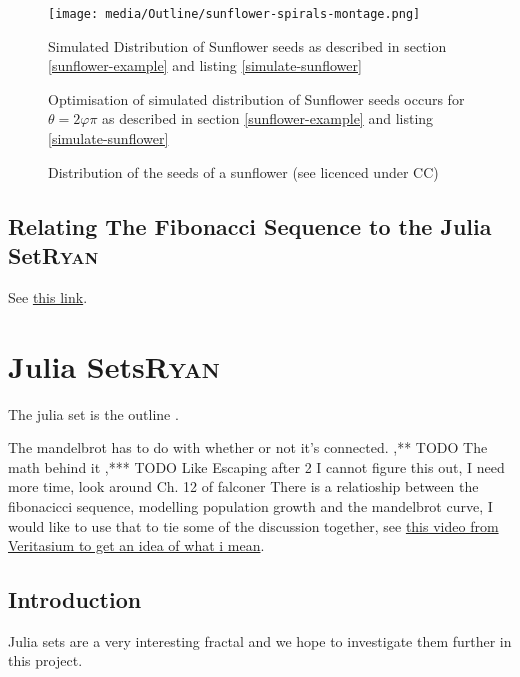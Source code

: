 \documentclass[a4paper,11pt,twoside]{article}
\begin{document}
\begin{figure}[htbp]
\centering
\texttt{[image: media/Outline/sunflower-spirals-montage.png]}
\caption{\label{simulate-sunflower-image}Simulated Distribution of Sunflower seeds as described in section \ref{sunflower-example} and listing \ref{simulate-sunflower}}
\end{figure}

\begin{figure}[htbp]
\centering

\caption{\label{simulate-sunflower-phi}Optimisation of simulated distribution of Sunflower seeds occurs for \(\theta =2 \varphi  \pi\) as described in section \ref{sunflower-example} and listing \ref{simulate-sunflower}}
\end{figure}


\begin{figure}[htbp]
\centering

\caption{\label{sunflower}Distribution of the seeds of a sunflower (see \cite{simonbrassCCSearch2006} licenced under CC)}
\end{figure}

\subsection{Relating The Fibonacci Sequence to the Julia Set\hfill{}\textsc{Ryan}}
\label{sec:org1086a83}
See \href{https://youtu.be/ovJcsL7vyrk}{this link}.
\section{Julia Sets\hfill{}\textsc{Ryan}}
\label{sec:org7b32ed6}

The julia set is the outline \cite[Ch. 14]{peitgenChaosFractalsNew2004}.

The mandelbrot has to do with whether or not it's connected.
,** TODO The math behind it
,*** TODO Like Escaping after 2
I cannot figure this out, I need more time, look around Ch. 12 of falconer \cite{falconerFractalGeometryMathematical2003}
There is a relatioship between the fibonacicci sequence, modelling population growth and the mandelbrot curve, I would like to use that to tie some of the discussion together, see \href{https://youtu.be/ovJcsL7vyrk}{this video from Veritasium to get an idea of what i mean}.


\subsection{Introduction}
\label{sec:orgc31e71c}
Julia sets are a very interesting fractal and we hope to investigate them further in this project.
\end{document}
